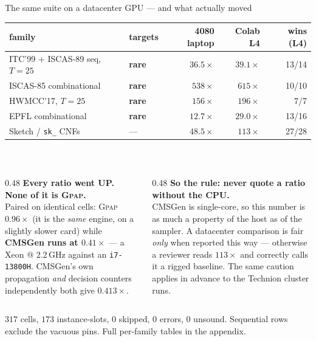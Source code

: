 \documentclass[aspectratio=169,11pt]{beamer}
\newcommand{\good}[1]{\textcolor{gpapgreen}{#1}}
\newcommand{\bad}[1]{\textcolor{gpapred}{#1}}
\newcommand{\rem}[1]{{\footnotesize\textcolor{gpapgray}{#1}}}
\newcommand{\GPAP}{\textsc{Gpap}}
\newcommand{\keyw}[1]{\textcolor{gpapblue}{\textbf{#1}}}
\begin{document}
\begin{frame}{The same suite on a datacenter GPU --- and what actually moved}
  \centering
  \small
  \begin{tabular}{@{}llrrr@{}}
    \toprule
    family & targets & 4080 laptop & \textbf{Colab L4} & wins (L4) \\
    \midrule
    ITC'99 $+$ ISCAS-89 seq, $T{=}25$ & \keyw{rare} & $36.5\times$  & $39.1\times$  & 13/14 \\
    ISCAS-85 combinational            & \keyw{rare} & $538\times$   & $615\times$   & 10/10 \\
    HWMCC'17, $T{=}25$                & \keyw{rare} & $156\times$   & $196\times$   & 7/7 \\
    EPFL combinational                & \keyw{rare} & $12.7\times$  & $29.0\times$  & 13/16 \\
    Sketch / \texttt{sk\_} CNFs       & ---         & $48.5\times$  & $113\times$   & 27/28 \\
    \bottomrule
  \end{tabular}
  \\[0.8em]
  \begin{columns}[T]
    \begin{column}{0.48\textwidth}
      \bad{\textbf{Every ratio went UP. None of it is \GPAP{}.}}
      \\[0.3em]
      Paired on identical cells: \GPAP{} $0.96\times$ (it is the \emph{same} engine, on a slightly
      slower card) while \keyw{CMSGen runs at $0.41\times$} --- a Xeon @ 2.2\,GHz against an
      \texttt{i7-13800H}.
      \rem{CMSGen's own propagation \emph{and} decision counters independently both give
      $0.413\times$.}
    \end{column}
    \begin{column}{0.48\textwidth}
      \good{\textbf{So the rule: never quote a ratio without the CPU.}}
      \\[0.3em]
      CMSGen is single-core, so this number is as much a property of the host as of the sampler.
      A datacenter comparison is fair \emph{only} when reported this way --- otherwise a reviewer
      reads $113\times$ and correctly calls it a rigged baseline.
      \rem{The same caution applies in advance to the Technion cluster runs.}
    \end{column}
  \end{columns}
  \vspace{0.3em}
  \centering
  \rem{$317$ cells, $173$ instance-slots, \good{0 skipped, 0 errors, 0 unsound}. Sequential rows
  exclude the vacuous pins. Full per-family tables in the appendix.}
\end{frame}
\end{document}
